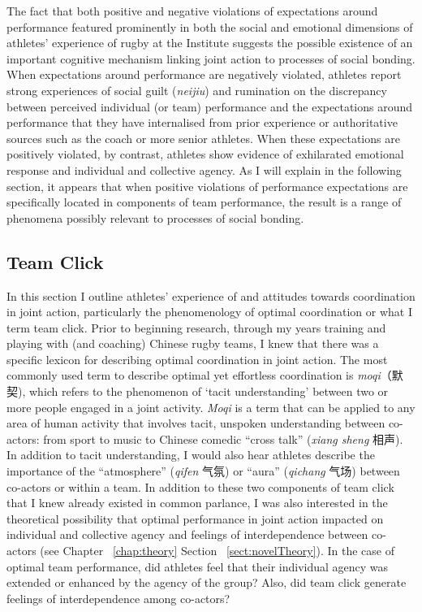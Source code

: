 \begin{CJK}{UTF8}{gbsn}
The fact that both positive and negative violations of expectations around performance featured prominently in both the social and emotional dimensions of athletes' experience of rugby at the Institute suggests the possible existence of an important cognitive mechanism linking joint action to processes of social bonding.  When expectations around performance are negatively violated, athletes report strong experiences of social guilt (\textit{neijiu}) and rumination on the discrepancy between perceived individual (or team) performance and the expectations around performance that they have internalised from prior experience or authoritative sources such as the coach or more senior athletes.  When these expectations are positively violated, by contrast, athletes show evidence of exhilarated emotional response and individual and collective agency.  As I will explain in the following section, it appears that when positive violations of performance expectations are specifically located in components of team performance, the result is a range of phenomena possibly relevant to processes of social bonding.



\clearpage
\subsection{Team Click\label{sect:teamClick}}
In this section I outline athletes' experience of and attitudes towards coordination in joint action, particularly the phenomenology of optimal coordination or what I term team click.  Prior to beginning research, through my years training and playing with (and coaching) Chinese rugby teams, I knew that there was a specific lexicon for describing optimal coordination in joint action.  The most commonly used term to describe optimal yet effortless coordination is \textit{moqi}（默契), which refers to the phenomenon of `tacit understanding' between two or more people engaged in a joint activity. \textit{Moqi} is a term that can be applied to any area of human activity that involves tacit, unspoken understanding between co-actors: from sport to music to Chinese comedic ``cross talk'' (\textit{xiang sheng} 相声).  In addition to tacit understanding, I would also hear athletes describe the importance of the ``atmosphere'' (\textit{qifen} 气氛) or ``aura'' (\textit{qichang} 气场) between co-actors or within a team.  In addition to these two components of team click that I knew already existed in common parlance, I was also interested in the theoretical possibility that optimal performance in joint action impacted on individual and collective agency and feelings of interdependence between co-actors (see Chapter ~\ref{chap:theory} Section ~\ref{sect:novelTheory}).  In the case of optimal team performance, did athletes feel that their individual agency was extended or enhanced by the agency of the group?  Also, did team click generate feelings of interdependence among co-actors?


\end{CJK}
